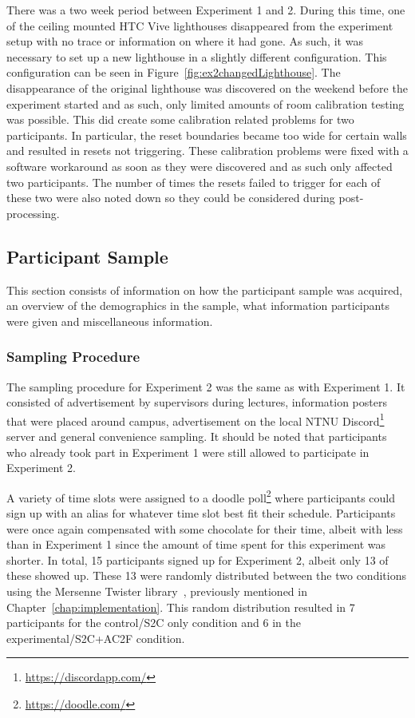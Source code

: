 There was a two week period between Experiment 1 and 2. During this time, one of the ceiling mounted HTC Vive lighthouses disappeared from the experiment setup with no trace or information on where it had gone. As such, it was necessary to set up a new lighthouse in a slightly different configuration. This configuration can be seen in Figure~\ref{fig:ex2changedLighthouse}. The disappearance of the original lighthouse was discovered on the weekend before the experiment started and as such, only limited amounts of room calibration testing was possible. This did create some calibration related problems for two participants. In particular, the reset boundaries became too wide for certain walls and resulted in resets not triggering. These calibration problems were fixed with a software workaround as soon as they were discovered and as such only affected two participants. The number of times the resets failed to trigger for each of these two were also noted down so they could be considered during post-processing. 

\subsection{Participant Sample}
This section consists of information on how the participant sample was acquired, an overview of the demographics in the sample, what information participants were given and miscellaneous information. 
   
\subsubsection{Sampling Procedure}
The sampling procedure for Experiment 2 was the same as with Experiment 1. It consisted of advertisement by supervisors during lectures, information posters that were placed around campus, advertisement on the local NTNU Discord\footnote{\url{https://discordapp.com/}} server and general convenience sampling. It should be noted that participants who already took part in Experiment 1 were still allowed to participate in Experiment 2.

A variety of time slots were assigned to a doodle poll\footnote{\url{https://doodle.com/}} where participants could sign up with an alias for whatever time slot best fit their schedule. Participants were once again compensated with some chocolate for their time, albeit with less than in Experiment 1 since the amount of time spent for this experiment was shorter. In total, 15 participants signed up for Experiment 2, albeit only 13 of these showed up. These 13 were randomly distributed between the two conditions using the Mersenne Twister library~\cite{MersenneTwisterLibraryLink},  previously mentioned in  Chapter~\ref{chap:implementation}. This random distribution resulted in 7 participants for the control/S2C only condition and 6 in the experimental/S2C+AC2F condition. 


